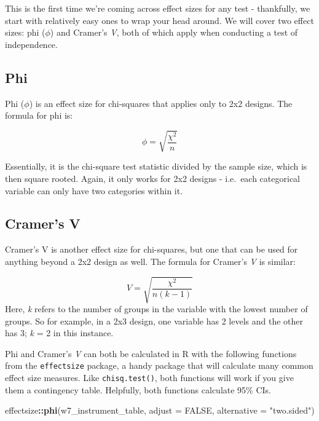 \documentclass[
]{book}
\newenvironment{Shaded}{\begin{snugshade}}{\end{snugshade}}
\newcommand{\AttributeTok}[1]{\textcolor[rgb]{0.13,0.29,0.53}{#1}}
\newcommand{\ConstantTok}[1]{\textcolor[rgb]{0.56,0.35,0.01}{#1}}
\newcommand{\FunctionTok}[1]{\textcolor[rgb]{0.13,0.29,0.53}{\textbf{#1}}}
\newcommand{\NormalTok}[1]{#1}
\newcommand{\SpecialCharTok}[1]{\textcolor[rgb]{0.81,0.36,0.00}{\textbf{#1}}}
\newcommand{\StringTok}[1]{\textcolor[rgb]{0.31,0.60,0.02}{#1}}
\begin{document}
This is the first time we're coming across effect sizes for any test - thankfully, we start with relatively easy ones to wrap your head around. We will cover two effect sizes: phi (\(\phi\)) and Cramer's \emph{V}, both of which apply when conducting a test of independence.

\subsection{Phi}\label{phi}

Phi (\(\phi\)) is an effect size for chi-squares that applies only to 2x2 designs. The formula for phi is:

\[
\phi = \sqrt{\frac{\chi^2}{n}}
\]

Essentially, it is the chi-square test statistic divided by the sample size, which is then square rooted. Again, it only works for 2x2 designs - i.e.~each categorical variable can only have two categories within it.

\subsection{Cramer's V}\label{cramers-v}

Cramer's V is another effect size for chi-squares, but one that can be used for anything beyond a 2x2 design as well. The formula for Cramer's \emph{V} is similar:

\[
V = \sqrt{\frac{\chi^2}{n(k-1)}}
\]
Here, \emph{k} refers to the number of groups in the variable with the lowest number of groups. So for example, in a 2x3 design, one variable has 2 levels and the other has 3; \emph{k} = 2 in this instance.

Phi and Cramer's \emph{V} can both be calculated in R with the following functions from the \texttt{effectsize} package, a handy package that will calculate many common effect size measures. Like \texttt{chisq.test()}, both functions will work if you give them a contingency table. Helpfully, both functions calculate 95\% CIs.

\begin{Shaded}
\begin{Highlighting}[]
\NormalTok{effectsize}\SpecialCharTok{::}\FunctionTok{phi}\NormalTok{(w7\_instrument\_table, }\AttributeTok{adjust =} \ConstantTok{FALSE}\NormalTok{, }\AttributeTok{alternative =} \StringTok{"two.sided"}\NormalTok{)}
\end{Highlighting}
\end{Shaded}
\end{document}

